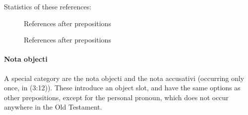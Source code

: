 \documentclass{report}
\newcommand{\hebr}[1]{\cjRL{#1}}
\begin{document}
Statistics of these references:
\begin{figure}

\caption{References after prepositions}
\end{figure}
\begin{figure}

\caption{References after prepositions}
\end{figure}

\paragraph{Nota objecti \hebr{>T}}
A special category are the nota objecti \hebr{>T} and the nota accusativi \hebr{JT} (occurring only once, in (3:12)). These introduce an object slot, and have the same options as other prepositions, except for the personal pronoun, which does not occur anywhere in the Old Testament.
\end{document}
